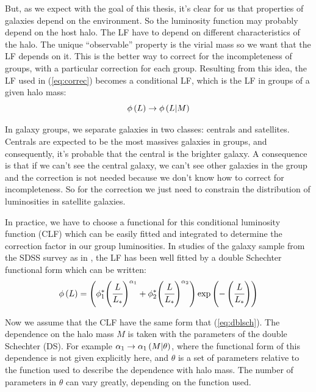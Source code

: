 But, as we expect with the goal of this thesis, it's clear for us that
properties of galaxies depend on the environment. So the luminosity function
may probably depend on the host halo. The LF have to depend on different
characteristics of the halo. The unique ``observable'' property is the virial
mass so we want that the LF depends on it. This is the better way to correct
for the incompleteness of groups, with a particular correction for each group.
 Resulting from this idea, the LF used in (\ref{eq:correc}) becomes a
conditional LF, which is the LF in groups of a given halo mass:
%
\begin{equation}
    \phi\pg{L}\pd\rightarrow\phi\pg{L|M}\pd%
\end{equation}
%

In galaxy groups, we separate galaxies in two classes: centrals and satellites.
Centrals are expected to be the most massives galaxies in groups, and
consequently, it's probable that the central is the brighter galaxy. A
consequence is that if we can't see the central galaxy, we can't see other
galaxies in the group and the correction is not needed because we don't know
how to correct for incompleteness. So for the correction we just need to
constrain the distribution of luminosities in satellite galaxies.

In practice, we have to choose a functional for this conditional luminosity
function (CLF) which can be easily fitted and integrated to determine the
correction factor in our group luminosities. In studies of the galaxy sample
from the SDSS survey as in \citet{Blanton+05}, the LF has been well fitted by a
double Schechter functional form which can be written:
%
\begin{equation}\label{eq:dblsch}
    \phi\pg{L}\pd=\pg{\phi_1^*{\pg{\cfrac{L}{L_*}}\pd}^{\alpha_1}+\phi_2^*{\pg{\cfrac{L}{L_*}}\pd}^{\alpha_2}}\pd\exp\pg{-\pg{\cfrac{L}{L_*}}\pd}\pd%
\end{equation}

Now we assume that the CLF have the same form that (\ref{eq:dblsch}). The
dependence on the halo mass $M$ is taken with the parameters of the double
Schechter (DS). For example $\alpha_1\rightarrow\alpha_1\left({M|\theta}\right)$,
where the functional form of this dependence is not given explicitly here, and
$\theta$ is a set of parameters relative to the function used to describe the
dependence with halo mass. The number of parameters in $\theta$ can vary
greatly, depending on the function used.

